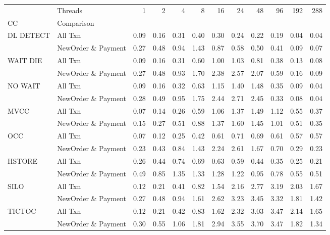 \begin{tabular}{llrrrrrrrrrr}
\toprule
       & Threads &  1   &  2   &  4   &  8   &  16  &  24  &  48  &  96  &  192 &  288 \\
CC & Comparison &      &      &      &      &      &      &      &      &      &      \\
\midrule
DL DETECT & All Txn & 0.09 & 0.16 & 0.31 & 0.40 & 0.30 & 0.24 & 0.22 & 0.19 & 0.04 & 0.04 \\
       & NewOrder \& Payment & 0.27 & 0.48 & 0.94 & 1.43 & 0.87 & 0.58 & 0.50 & 0.41 & 0.09 & 0.07 \\
WAIT DIE & All Txn & 0.09 & 0.16 & 0.31 & 0.60 & 1.00 & 1.03 & 0.81 & 0.38 & 0.13 & 0.08 \\
       & NewOrder \& Payment & 0.27 & 0.48 & 0.93 & 1.70 & 2.38 & 2.57 & 2.07 & 0.59 & 0.16 & 0.09 \\
NO WAIT & All Txn & 0.09 & 0.16 & 0.32 & 0.63 & 1.15 & 1.40 & 1.48 & 0.35 & 0.09 & 0.04 \\
       & NewOrder \& Payment & 0.28 & 0.49 & 0.95 & 1.75 & 2.44 & 2.71 & 2.45 & 0.33 & 0.08 & 0.04 \\
MVCC & All Txn & 0.07 & 0.14 & 0.26 & 0.59 & 1.06 & 1.37 & 1.49 & 1.12 & 0.55 & 0.37 \\
       & NewOrder \& Payment & 0.15 & 0.27 & 0.51 & 0.88 & 1.37 & 1.60 & 1.45 & 1.01 & 0.51 & 0.35 \\
OCC & All Txn & 0.07 & 0.12 & 0.25 & 0.42 & 0.61 & 0.71 & 0.69 & 0.61 & 0.57 & 0.57 \\
       & NewOrder \& Payment & 0.23 & 0.43 & 0.84 & 1.43 & 2.24 & 2.61 & 1.67 & 0.70 & 0.29 & 0.23 \\
HSTORE & All Txn & 0.26 & 0.44 & 0.74 & 0.69 & 0.63 & 0.59 & 0.44 & 0.35 & 0.25 & 0.21 \\
       & NewOrder \& Payment & 0.49 & 0.85 & 1.35 & 1.33 & 1.28 & 1.22 & 0.95 & 0.78 & 0.55 & 0.51 \\
SILO & All Txn & 0.12 & 0.21 & 0.41 & 0.82 & 1.54 & 2.16 & 2.77 & 3.19 & 2.03 & 1.67 \\
       & NewOrder \& Payment & 0.27 & 0.48 & 0.94 & 1.61 & 2.62 & 3.23 & 3.45 & 3.32 & 1.81 & 1.42 \\
TICTOC & All Txn & 0.12 & 0.21 & 0.42 & 0.83 & 1.62 & 2.32 & 3.03 & 3.47 & 2.14 & 1.65 \\
       & NewOrder \& Payment & 0.30 & 0.55 & 1.06 & 1.81 & 2.94 & 3.55 & 3.70 & 3.47 & 1.82 & 1.34 \\
\bottomrule
\end{tabular}
